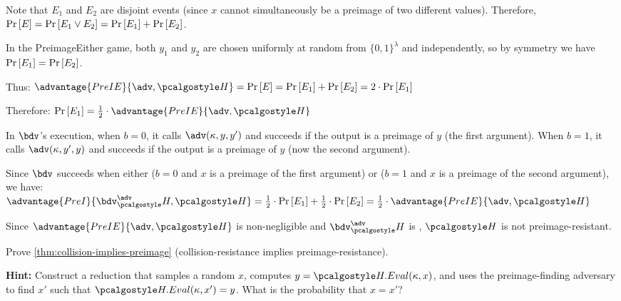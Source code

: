 \begin{mysolution}
  Note that $E_1$ and $E_2$ are disjoint events (since $x$ cannot simultaneously be a preimage of two different values).
  Therefore, $\Pr\left[ E \right] = \Pr\left[ E_1 \vee E_2 \right] = \Pr\left[ E_1 \right] + \Pr\left[ E_2 \right]$.
  
  In the PreimageEither game, both $y_1$ and $y_2$ are chosen uniformly at random from $\{0,1\}^{\lambda}$ and independently, so by symmetry we have $\Pr\left[ E_1 \right] = \Pr\left[ E_2 \right]$.
  
  Thus: $\advantage{PreIE}{\adv, \algo{H}} = \pr{E} = \pr{E_1} + \pr{E_2} = 2 \cdot \pr{E_1}$
  
  Therefore: $\pr{E_1} = \frac{1}{2} \cdot \advantage{PreIE}{\adv, \algo{H}}$
  
  In $\bdv$'s execution, when $b = 0$, it calls $\adv(\kappa, y, y')$ and succeeds if the output is a preimage of $y$ (the first argument).
  When $b = 1$, it calls $\adv(\kappa, y', y)$ and succeeds if the output is a preimage of $y$ (now the second argument).
  
  Since $\bdv$ succeeds when either ($b = 0$ and $x$ is a preimage of the first argument) or ($b = 1$ and $x$ is a preimage of the second argument), we have:
  $\advantage{PreI}{\bdv^\adv_\algo{H}, \algo{H}} = \frac{1}{2} \cdot \pr{E_1} + \frac{1}{2} \cdot \pr{E_2} = \frac{1}{2} \cdot \advantage{PreIE}{\adv, \algo{H}}$
  
  Since $\advantage{PreIE}{\adv, \algo{H}}$ is non-negligible and $\bdv^\adv_\algo{H}$ is \ppt, $\algo{H}$ is not preimage-resistant.
\end{mysolution}
\fi

\begin{exercise}\label{ex:collision-implies-preimage}
  Prove \autoref{thm:collision-implies-preimage} (collision-resistance implies preimage-resistance).
  
  \textbf{Hint:} Construct a reduction that samples a random $x$, computes $y = \algo{H.Eval}(\kappa, x)$, and uses the preimage-finding adversary to find $x'$ such that $\algo{H.Eval}(\kappa, x') = y$. What is the probability that $x = x'$?
\end{exercise}

